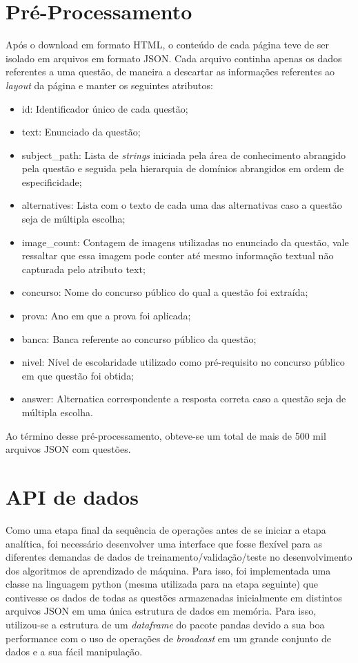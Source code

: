 \section{Pré-Processamento}

Após o download em formato HTML, o conteúdo de cada página teve de ser isolado em arquivos em formato JSON. Cada arquivo continha apenas os dados referentes a uma questão, de maneira a descartar as informações referentes ao \textit{layout} da página e manter os seguintes atributos:

\begin{itemize}
\item id: Identificador único de cada questão;
\item text: Enunciado da questão;
\item subject\_path: Lista de \textit{strings} iniciada pela área de conhecimento abrangido pela questão e seguida pela hierarquia de domínios abrangidos em ordem de especificidade;
\item alternatives: Lista com o texto de cada uma das alternativas caso a questão seja de múltipla escolha;
\item image\_count: Contagem de imagens utilizadas no enunciado da questão, vale ressaltar que essa imagem pode conter até mesmo informação textual não capturada pelo atributo text;
\item concurso: Nome do concurso público do qual a questão foi extraída;
\item prova: Ano em que a prova foi aplicada;
\item banca: Banca referente ao concurso público da questão;
\item nivel: Nível de escolaridade utilizado como pré-requisito no concurso público em que questão foi obtida;
\item answer: Alternatica correspondente a resposta correta caso a questão seja de múltipla escolha.
\end{itemize}

Ao término desse pré-processamento, obteve-se um total de mais de 500 mil arquivos JSON com questões.

\section{API de dados}

Como uma etapa final da sequência de operações antes de se iniciar a etapa analítica, foi necessário desenvolver uma interface que fosse flexível para as diferentes demandas de dados de treinamento/validação/teste no desenvolvimento dos algoritmos de aprendizado de máquina. Para isso, foi implementada uma classe na linguagem python (mesma utilizada para na etapa seguinte) que contivesse os dados de todas as questões armazenadas inicialmente em distintos arquivos JSON em uma única estrutura de dados em memória. Para isso, utilizou-se a estrutura de um \textit{dataframe} do pacote pandas devido a sua boa performance com o uso de operações de \textit{broadcast} em um grande conjunto de dados e a sua fácil manipulação.

